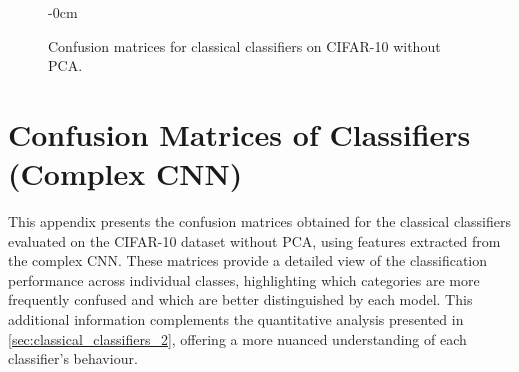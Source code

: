 \documentclass[journal,article,submit,pdftex,moreauthors]{Definitions/mdpi}
\begin{document}
\begin{figure}[H]
\begin{adjustwidth}{-\extralength}{0cm}
{}\hfill
{}\\[1em]
\end{adjustwidth}
\caption{Confusion matrices for classical classifiers on CIFAR-10 without PCA.\label{fig:confmats_cifar10_sem_pca2}}
\end{figure}



\clearpage
\section[\appendixname~\thesection]{Confusion Matrices of Classifiers (Complex CNN)}
\label{ap:ap2}

This appendix presents the confusion matrices obtained for the classical classifiers evaluated on the CIFAR-10 dataset without PCA, using features extracted from the complex CNN. These matrices provide a detailed view of the classification performance across individual classes, highlighting which categories are more frequently confused and which are better distinguished by each model. This additional information complements the quantitative analysis presented in \autoref{sec:classical_classifiers_2}, offering a more nuanced understanding of each classifier’s behaviour.
\end{document}
